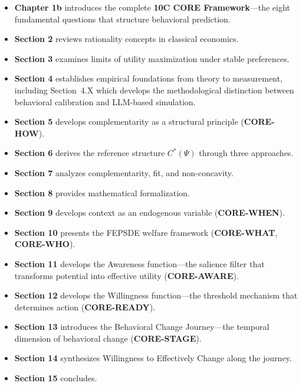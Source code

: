 \begin{itemize}
    \item \textbf{Chapter 1b} introduces the complete \textbf{10C CORE Framework}---the eight fundamental questions that structure behavioral prediction.

    \item \textbf{Section 2} reviews rationality concepts in classical economics.

    \item \textbf{Section 3} examines limits of utility maximization under stable preferences.

    \item \textbf{Section 4} establishes empirical foundations from theory to measurement, including Section~4.X which develops the methodological distinction between behavioral calibration and LLM-based simulation.

    \item \textbf{Section 5} develops complementarity as a structural principle (\textbf{CORE-HOW}).

    \item \textbf{Section 6} derives the reference structure $C^*(\Psi)$ through three approaches.

    \item \textbf{Section 7} analyzes complementarity, fit, and non-concavity.

    \item \textbf{Section 8} provides mathematical formalization.

    \item \textbf{Section 9} develops context as an endogenous variable (\textbf{CORE-WHEN}).

    \item \textbf{Section 10} presents the FEPSDE welfare framework (\textbf{CORE-WHAT}, \textbf{CORE-WHO}).

    \item \textbf{Section 11} develops the Awareness function---the salience filter that transforms potential into effective utility (\textbf{CORE-AWARE}).

    \item \textbf{Section 12} develops the Willingness function---the threshold mechanism that determines action (\textbf{CORE-READY}).

    \item \textbf{Section 13} introduces the Behavioral Change Journey---the temporal dimension of behavioral change (\textbf{CORE-STAGE}).

    \item \textbf{Section 14} synthesizes Willingness to Effectively Change along the journey.

    \item \textbf{Section 15} concludes.
\end{itemize}

